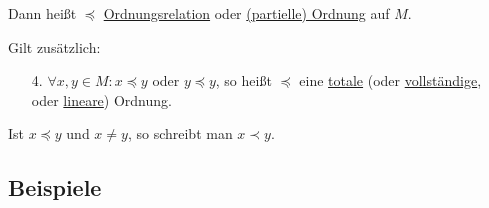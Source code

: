 \documentclass[a4paper, 12pt, twoside] {article}
\begin{document}
Dann heißt $\preceq$ \underline{Ordnungsrelation} oder \underline{(partielle) Ordnung} auf $M$.

Gilt zusätzlich:

\begin{enumerate}

\item[4.] $\forall x, y \in M: x \preceq y$ oder $y \preceq y$,
so heißt $\preceq$ eine \underline{totale} (oder \underline{vollständige}, oder \underline{lineare}) Ordnung.
\end{enumerate}


Ist $x \preceq y$ und $x \neq y$, so schreibt man $x \prec y$.

\subsection{Beispiele}
\end{document}
